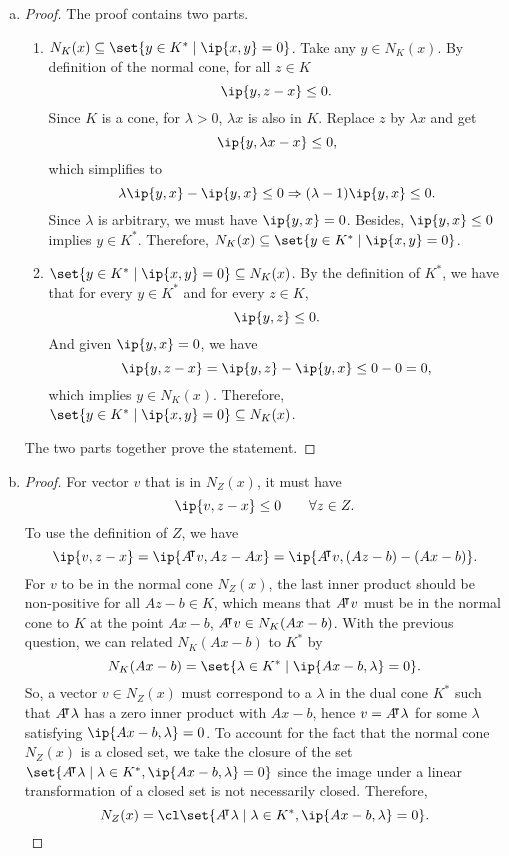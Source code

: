 \documentclass{article}
\begin{document}
\begin{solution}
\begin{enumerate}[(a)]
{\begin{proof}
                Let $y$ be any feasible directions in $F_K(x)$. By definition, for all small $t>0$, $x+ty\in K$. By the convexity of $K$, the line segment connecting $x$ and $x+ty$ must entirely lie in $K$. For a sufficiently small $t$, this implies that $y$ can be represented as \[y=\frac{1}{t}(x+ty)-\frac{1}{t}x\Rightarrow(x+ty)-x=z-x,\] where $z=x+ty\in K$. We can set $\alpha=1$ to match the form required. So, $y=z-\alpha x$ with $x\in K$ and $\alpha=1\geq 0$.
            \end{proof}
        }
        \item {
            \begin{proof}
                The proof contains two parts.
                \begin{enumerate}
                    \item $N_K(x)\subseteq\set{y\in K^*\mid \ip{x,y}=0}$. Take any $y\in N_K(x)$. By definition of the normal cone, for all $z\in K$ \[\ip{y, z-x}\leq 0.\] Since $K$ is a cone, for $\lambda>0$, $\lambda x$ is also in $K$. Replace $z$  by $\lambda x$ and get \[\ip{y, \lambda x-x}\leq 0,\] which simplifies to \[\lambda\ip{y,x}-\ip{y,x}\leq 0 \Rightarrow (\lambda-1)\ip{y, x}\leq 0.\] Since $\lambda$ is arbitrary, we must have $\ip{y, x}=0$. Besides, $\ip{y,x}\leq 0$ implies $y\in K^*$. Therefore, $N_K(x)\subseteq\set{y\in K^*\mid \ip{x,y}=0}$.
                    \item $\set{y\in K^*\mid \ip{x,y}=0}\subseteq N_K(x)$. By the definition of $K^*$, we have that for every $y\in K^*$ and for every $z\in K$, \[\ip{y,z}\leq 0.\] And given $\ip{y, x}=0$, we have \[\ip{y, z-x}=\ip{y, z}-\ip{y, x}\leq 0-0 =0,\] which implies $y\in N_K(x)$. Therefore, $\set{y\in K^*\mid \ip{x,y}=0}\subseteq N_K(x)$.
                \end{enumerate}
                The two parts together prove the statement.
            \end{proof}
        }
        \item {
            \begin{proof}
                For vector $v$ that is in $N_Z(x)$, it must have \[\ip{v, z-x}\leq 0 \qquad \forall z\in Z.\] To use the definition of $Z$, we have \[\ip{v, z-x}=\ip{A\trn v,Az-Ax}=\ip{A\trn v, (Az-b)-(Ax-b)}.\] For $v$ to be in the normal cone $N_Z(x)$, the last inner product should be non-positive for all $Az-b\in K$, which means that $A{}^{\mkern-4mu\intercal} v$ must be in the normal cone to $K$ at the point $Ax-b$, \ie $A{}^{\mkern-4mu\intercal} v\in N_K(Ax-b)$. With the previous question, we can related $N_K(Ax-b)$ to $K^*$ by \[N_K(Ax-b)=\set{\lambda\in K^*\mid \ip{Ax-b, \lambda}=0}.\] So, a vector $v\in N_Z(x)$ must correspond to a $\lambda$ in the dual cone $K^*$ such that $A{}^{\mkern-4mu\intercal}\lambda$ has a zero inner product with $Ax-b$, hence $v=A{}^{\mkern-4mu\intercal}\lambda$ for some $\lambda$ satisfying $\ip{Ax-b, \lambda}=0$. To account for the fact that the normal cone $N_Z(x)$ is a closed set, we take the closure of the set $\set{A\trn\lambda\mid\lambda\in K^*,\ip{Ax-b,\lambda}=0}$ since the image under a linear transformation of a closed set is not necessarily closed. Therefore, \[N_Z(x)=\cl\set{A\trn\lambda\mid\lambda\in K^*,\ip{Ax-b,\lambda}=0}.\]

\end{proof}}
\end{enumerate}
\end{solution}
\end{document}
